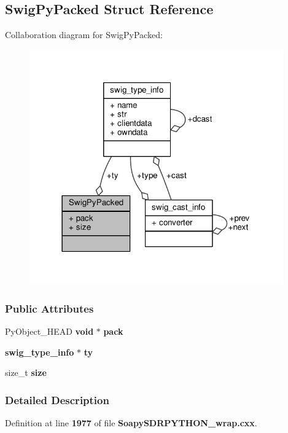 \subsection{Swig\+Py\+Packed Struct Reference}
\label{structSwigPyPacked}


Collaboration diagram for Swig\+Py\+Packed\+:
\nopagebreak
\begin{figure}[H]
\begin{center}
\leavevmode
\includegraphics[width=310pt]{d0/db7/structSwigPyPacked__coll__graph}
\end{center}
\end{figure}
\subsubsection*{Public Attributes}
\begin{DoxyCompactItemize}
\item 
Py\+Object\+\_\+\+H\+E\+AD {\bf void} $\ast$ {\bf pack}
\item 
{\bf swig\+\_\+type\+\_\+info} $\ast$ {\bf ty}
\item 
size\+\_\+t {\bf size}
\end{DoxyCompactItemize}


\subsubsection{Detailed Description}


Definition at line {\bf 1977} of file {\bf Soapy\+S\+D\+R\+P\+Y\+T\+H\+O\+N\+\_\+wrap.\+cxx}.



